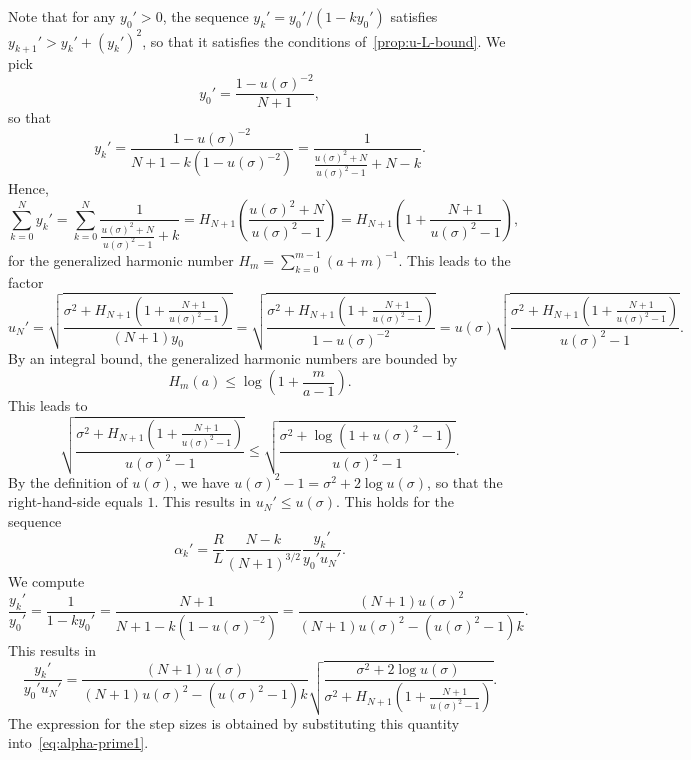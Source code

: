 \documentclass{article}
\begin{document}
\begin{appendixproof}
    Note that for any $y_0'>0$, the sequence $y_k'=y_0'/(1-ky_0')$ satisfies $y_{k+1}'>y_k'+(y_k')^2$, so that it satisfies the conditions of~\cref{prop:u-L-bound}.
    We pick
    \[
    y_0'=\frac{1-u(\sigma)^{-2}}{N+1},
    \]
    so that
    \[
    y_k'=\frac{1-u(\sigma)^{-2}}{N+1-k(1-u(\sigma)^{-2})}=\frac{1}{\frac{u(\sigma)^2+N}{u(\sigma)^2-1}+N-k}.
    \]
    Hence,
    \[
    \sum_{k=0}^Ny_k'=\sum_{k=0}^N\frac{1}{\frac{u(\sigma)^2+N}{u(\sigma)^2-1}+k}=H_{N+1}\left(\frac{u(\sigma)^2+N}{u(\sigma)^2-1}\right)=H_{N+1}\left(1+\frac{N+1}{u(\sigma)^2-1}\right),
    \]
    for the generalized harmonic number $H_m=\sum_{k=0}^{m-1}(a+m)^{-1}$. This leads to the factor
    \[
    u_N'=\sqrt{\frac{\sigma^2+H_{N+1}(1+\frac{N+1}{u(\sigma)^2-1})}{(N+1)y_0}}=\sqrt{\frac{\sigma^2+H_{N+1}(1+\frac{N+1}{u(\sigma)^2-1})}{1-u(\sigma)^{-2}}}=u(\sigma)\sqrt{\frac{\sigma^2+H_{N+1}(1+\frac{N+1}{u(\sigma)^2-1})}{u(\sigma)^2-1}}.
    \]
    By an integral bound, the generalized harmonic numbers are bounded by
    \[
    H_m(a)\le\log\left(1+\frac m{a-1}\right).
    \]
    This leads to
    \[
    \sqrt{\frac{\sigma^2+H_{N+1}(1+\frac{N+1}{u(\sigma)^2-1})}{u(\sigma)^2-1}}\le \sqrt{\frac{\sigma^2+\log(1+u(\sigma)^2-1)}{u(\sigma)^2-1}}.
    \]
    By the definition of $u(\sigma)$, we have $u(\sigma)^2-1=\sigma^2+2\log u(\sigma)$, so that the right-hand-side equals $1$. This results in $u_N'\le u(\sigma)$.
    This holds for the sequence
    \begin{equation}\label{eq:alpha-prime1}
    \alpha_k'=\frac{R}{L}\frac{N-k}{(N+1)^{3/2}}\frac{y_k'}{y_0'u_N'}.
    \end{equation}
    We compute
    \[
    \frac{y_k'}{y_0'}=\frac{1}{1-ky_0'}=\frac{N+1}{N+1-k(1-u(\sigma)^{-2})}=\frac{(N+1)u(\sigma)^2}{(N+1)u(\sigma)^2-(u(\sigma)^2-1)k}.
    \]
    This results in
    \[
    \frac{y_k'}{y_0'u_N'}=\frac{(N+1)u(\sigma)}{(N+1)u(\sigma)^2-(u(\sigma)^2-1)k}\sqrt{\frac{\sigma^2+2\log u(\sigma)}{\sigma^2+H_{N+1}\left(1+\frac{N+1}{u(\sigma)^2-1}\right)}}.
    \]
    The expression for the step sizes is obtained by substituting this quantity into~\eqref{eq:alpha-prime1}.


\end{appendixproof}
\end{document}
